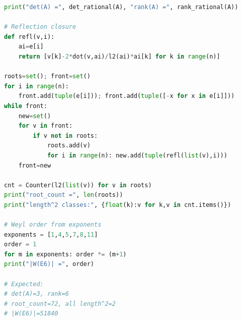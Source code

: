 \documentclass[12pt]{article}
\begin{document}
\begin{lstlisting}[language=Python,basicstyle=\ttfamily\small]
print("det(A) =", det_rational(A), "rank(A) =", rank_rational(A))

# Reflection closure
def refl(v,i):
    ai=e[i]
    return [v[k]-2*dot(v,ai)/l2(ai)*ai[k] for k in range(n)]

roots=set(); front=set()
for i in range(n):
    front.add(tuple(e[i])); front.add(tuple([-x for x in e[i]]))
while front:
    new=set()
    for v in front:
        if v not in roots:
            roots.add(v)
            for i in range(n): new.add(tuple(refl(list(v),i)))
    front=new

cnt = Counter(l2(list(v)) for v in roots)
print("root_count =", len(roots))
print("length^2 classes:", {float(k):v for k,v in cnt.items()})

# Weyl order from exponents
exponents = [1,4,5,7,8,11]
order = 1
for m in exponents: order *= (m+1)
print("|W(E6)| =", order)

# Expected:
# det(A)=3, rank=6
# root_count=72, all length^2=2
# |W(E6)|=51840
\end{lstlisting}
\end{document}
